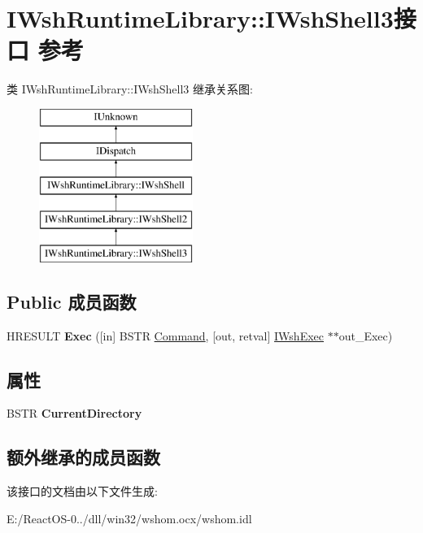 \hypertarget{interface_i_wsh_runtime_library_1_1_i_wsh_shell3}{}\section{I\+Wsh\+Runtime\+Library\+:\+:I\+Wsh\+Shell3接口 参考}
\label{interface_i_wsh_runtime_library_1_1_i_wsh_shell3}
类 I\+Wsh\+Runtime\+Library\+:\+:I\+Wsh\+Shell3 继承关系图\+:\begin{figure}[H]
\begin{center}
\leavevmode
\includegraphics[height=5.000000cm]{interface_i_wsh_runtime_library_1_1_i_wsh_shell3}
\end{center}
\end{figure}
\subsection*{Public 成员函数}
\begin{DoxyCompactItemize}
\item 
\mbox{\label{interface_i_wsh_runtime_library_1_1_i_wsh_shell3_aee8c86ee11033e6626475dda3d93bf87}} 
H\+R\+E\+S\+U\+LT {\bfseries Exec} (\mbox{[}in\mbox{]} B\+S\+TR \hyperlink{struct_command}{Command}, \mbox{[}out, retval\mbox{]} \hyperlink{interface_i_wsh_runtime_library_1_1_i_wsh_exec}{I\+Wsh\+Exec} $\ast$$\ast$out\+\_\+\+Exec)
\end{DoxyCompactItemize}
\subsection*{属性}
\begin{DoxyCompactItemize}
\item 
\mbox{\label{interface_i_wsh_runtime_library_1_1_i_wsh_shell3_aabaecd7c79e2fe28fbcc3818873d5d10}} 
B\+S\+TR {\bfseries Current\+Directory}
\end{DoxyCompactItemize}
\subsection*{额外继承的成员函数}


该接口的文档由以下文件生成\+:\begin{DoxyCompactItemize}
\item 
E\+:/\+React\+O\+S-\/0../dll/win32/wshom.\+ocx/wshom.\+idl\end{DoxyCompactItemize}
